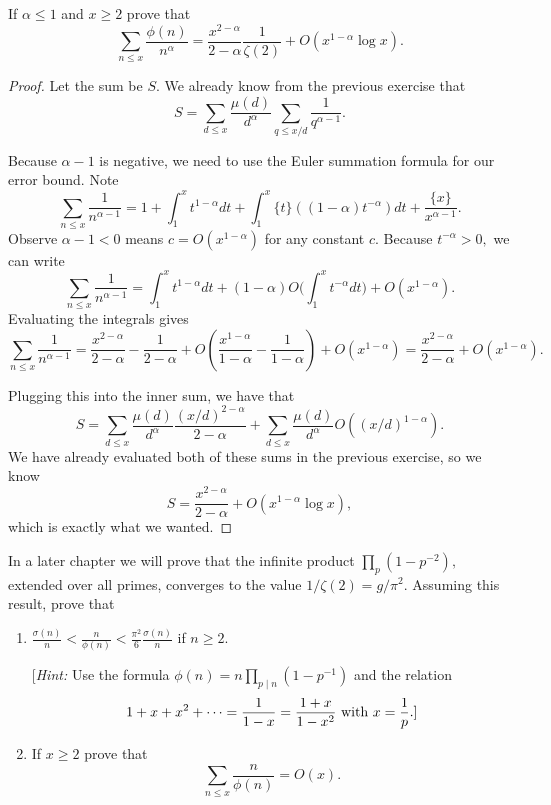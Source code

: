\begin{exercise}
If $\alpha\le1$ and $x\ge2$ prove that
\[\sum_{n\le x}\frac{\phi(n)}{n^\alpha}=\frac{x^{2-\alpha}}{2-\alpha}\frac1{\zeta(2)}+O\left(x^{1-\alpha}\log x\right).\]
\end{exercise}

\begin{proof}
Let the sum be $S.$ We already know from the previous exercise that
\[S=\sum_{d\le x}\frac{\mu(d)}{d^\alpha}\sum_{q\le x/d}\frac1{q^{\alpha-1}}.\]

Because $\alpha-1$ is negative, we need to use the Euler summation formula for our error bound. Note
\[\sum_{n\le x}\frac1{n^{\alpha-1}}=1+\int_1^xt^{1-\alpha}dt+\int_1^x\{t\}\left((1-\alpha)t^{-\alpha}\right)dt+\frac{\{x\}}{x^{\alpha-1}}.\]
Observe $\alpha-1<0$ means $c=O\left(x^{1-\alpha}\right)$ for any constant $c.$ Because $t^{-\alpha}>0,$ we can write
\[\sum_{n\le x}\frac1{n^{\alpha-1}}=\int_1^xt^{1-\alpha}dt+(1-\alpha)O\bigg(\int_1^xt^{-\alpha}dt\bigg)+O\left(x^{1-\alpha}\right).\]
Evaluating the integrals gives
\[\sum_{n\le x}\frac1{n^{\alpha-1}}=\frac{x^{2-\alpha}}{2-\alpha}-\frac1{2-\alpha}+O\left(\frac{x^{1-\alpha}}{1-\alpha}-\frac1{1-\alpha}\right)+O\left(x^{1-\alpha}\right)=\frac{x^{2-\alpha}}{2-\alpha}+O\left(x^{1-\alpha}\right).\]

Plugging this into the inner sum, we have that
\[S=\sum_{d\le x}\frac{\mu(d)}{d^\alpha}\frac{(x/d)^{2-\alpha}}{2-\alpha}+\sum_{d\le x}\frac{\mu(d)}{d^\alpha}O\left((x/d)^{1-\alpha}\right).\]
We have already evaluated both of these sums in the previous exercise, so we know
\[S=\frac{x^{2-\alpha}}{2-\alpha}+O\left(x^{1-\alpha}\log x\right),\]
which is exactly what we wanted.
\end{proof}

\begin{exercise}
In a later chapter we will prove that the infinite product $\prod_p\left(1-p^{-2}\right),$ extended over all primes, converges to the value $1/\zeta(2)=g/\pi^2.$ Assuming this result, prove that
\begin{enumerate}[label=(\alph*)]
    \item$\displaystyle\frac{\sigma(n)}n<\frac n{\phi(n)}<\frac{\pi^2}6\frac{\sigma(n)}n$ if $n\ge2.$
    
    [\textit{Hint:} Use the formula $\phi(n)=n\prod_{p\mid n}\left(1-p^{-1}\right)$ and the relation
    \[1+x+x^2+\cdots=\frac1{1-x}=\frac{1+x}{1-x^2}\text{ with }x=\frac1p.\text]\]
    \item If $x\ge2$ prove that
    \[\sum_{n\le x}\frac n{\phi(n)}=O(x).\]
\end{enumerate}
\end{exercise}

